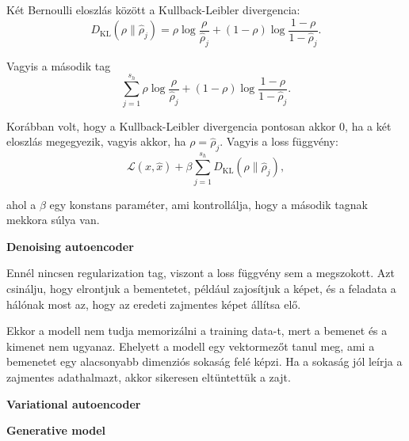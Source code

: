 \documentclass[12pt]{amsart}
\begin{document}
\vspace{5pt}

Két Bernoulli eloszlás között a Kullback-Leibler
divergencia:
\[
  D_{\text{KL}}(\rho \| \hat{\rho}_j) = \rho \log \frac{\rho
  }{\hat{\rho}_j} + (1-\rho) \log \frac{1-\rho}{1-
    \hat{\rho}_j}. 
\]

\vspace{5pt}

Vagyis a második tag
\[
  \sum_{j=1}^{s_h} \rho \log \frac{\rho }{\hat{\rho}_j} +
  (1-\rho) \log \frac{1-\rho}{1- \hat{\rho}_j}.
\]

\vspace{5pt}

Korábban volt, hogy a Kullback-Leibler divergencia pontosan
akkor $0$, ha a két eloszlás megegyezik, vagyis akkor, ha
$\rho = \hat{\rho}_j$. Vagyis a loss függvény:
\[
  \mathcal{L}(x, \hat{x})+ \beta \sum_{j=1}^{s_h}
  D_{\text{KL}}(\rho \| \hat{\rho}_j),
\]

\vspace{5pt}

ahol a $\beta$ egy konstans paraméter, ami kontrollálja,
hogy a második tagnak mekkora súlya van.

\vspace{10pt}

\textbf{Denoising autoencoder}

\vspace{10pt}

Ennél nincsen regularization tag, viszont a loss függvény
sem a megszokott. Azt csinálju, hogy elrontjuk a bementetet,
például zajosítjuk a képet, és a feladata a hálónak most az,
hogy az eredeti zajmentes képet állítsa elő.

\vspace{5pt}

Ekkor a modell nem tudja memorizálni a training data-t, mert
a bemenet és a kimenet nem ugyanaz. Ehelyett a modell egy
vektormezőt tanul meg, ami a bemenetet egy alacsonyabb
dimenziós sokaság felé képzi. Ha a sokaság jól leírja a
zajmentes adathalmazt, akkor sikeresen eltüntettük a zajt. 

\vspace{20pt}

\begin{center}
\textbf{Variational autoencoder}
\end{center}

\vspace{20pt}

\noindent
\textbf{Generative model}
\end{document}
